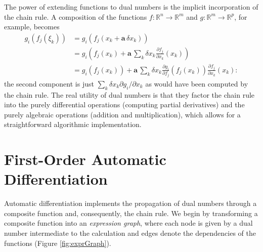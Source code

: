 \documentclass[11pt]{article}
\begin{document}
The power of extending functions to dual numbers is the implicit incorporation of 
the chain rule. A composition of the functions $f : \mathbb{R}^{n} \rightarrow \mathbb{R}^{m}$ 
and $g : \mathbb{R}^{m} \rightarrow \mathbb{R}^{p}$, for example, becomes
%
\begin{align*}
g_{i} \! \left( f_{j} \! \left( \xi_{k} \right) \right)
&= 
g_{i} \! \left( f_{j} \! \left( x_{k} + \mathbf{a} \, \delta x_{k} \right) \right)
\\
&=
g_{i} \! \left( f_{j} \! \left( x_{k} \right) 
+ \mathbf{a} \, \sum_{k} \delta x_{k} \frac{ \partial f_{j} }{ \partial x_{k} } \! \left( x_{k} \right) \right)
\\
&=
g_{i} \! \left( f_{j} \! \left( x_{k} \right) \right)
+ \mathbf{a} \, \sum_{k} \delta x_{k} 
\frac{ \partial g_{i} }{ \partial f_{j} }  \! \left( f_{j} \! \left( x_{k} \right) \right)
\frac{ \partial f_{j} }{ \partial x_{k} } \! \left( x_{k} \right):
\end{align*}
%
the second component is just $\sum_{k} \delta x_{k} \partial g_{i} / \partial x_{k} $ 
as would have been computed by the chain rule.  The real utility of dual numbers is 
that they factor the chain rule into the purely differential operations (computing partial
derivatives) and the purely algebraic operations (addition and multiplication), which 
allows for a straightforward algorithmic implementation.

\section*{First-Order Automatic Differentiation}

Automatic differentiation implements the propagation of dual numbers through a
composite function and, consequently, the chain rule.  We begin by transforming
a composite function into an \textit{expression graph}, where each node is given
by a dual number intermediate to the calculation and edges denote the 
dependencies of the functions (Figure \ref{fig:exprGraph}).
\end{document}
